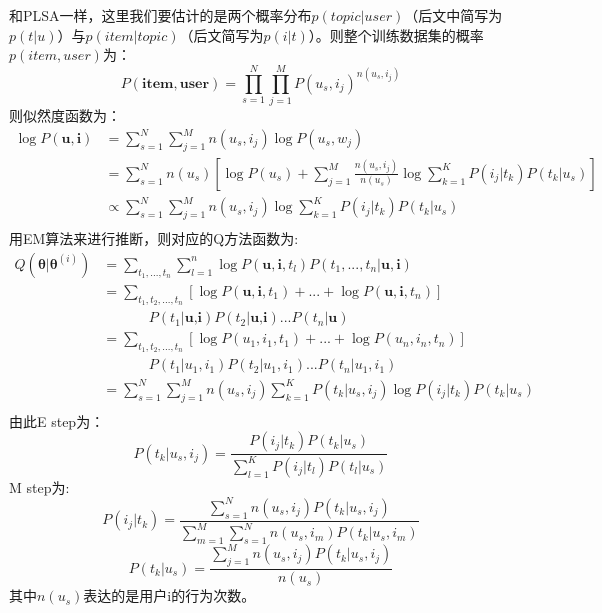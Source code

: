 和PLSA一样，这里我们要估计的是两个概率分布$p(topic|user)$（后文中简写为$p(t|u)$）与$p(item|topic)$（后文简写为$p(i|t)$）。则整个训练数据集的概率$p(item, user)$为：
\begin{equation}
P(\mathbf{item, user}) = \prod_{s=1}^N \prod_{j=1}^M P(u_s, i_j)^{n(u_s, i_j)}
\end{equation}
则似然度函数为：
\begin{equation}
\begin{split} \log P(\mathbf{u,i}) &= \sum_{s=1}^N \sum_{j=1}^M n(u_s, i_j) \log P(u_s, w_j) \\ &= \sum_{s=1}^N n(u_s) [\log P(u_s) + \sum_{j=1}^M \frac{n(u_s, i_j)}{n(u_s)} \log \sum_{k=1}^K P(i_j|t_k) P(t_k|u_s)] \\ & \propto \sum_{s=1}^N \sum_{j=1}^M n(u_s, i_j) \log \sum_{k=1}^K P(i_j|t_k) P(t_k|u_s) \\ \end{split} 
\end{equation}
用EM算法来进行推断，则对应的Q方法函数为:
\begin{equation} \begin{split} Q(\bm\theta|\bm\theta^{(i)}) &= \sum_{t_1, ..., t_n} \sum_{l=1}^n \log P(\mathbf{u,i},t_l) P(t_1, ..., t_n|\mathbf{u,i}) \\ &= \sum_{t_1,t_2,...,t_n} [ \log P(\mathbf{u,i},t_1) + ... + \log P(\mathbf{u,i},t_n)] \\ & \ \ \ \ \ \ \ \ \ \ \ \ \ \ \ P(t_1|\textbf{u,i}) P(t_2|\textbf{u,i}) ... P(t_n|\textbf{u}) \\ &= \sum_{t_1,t_2,...,t_n} [\log P(u_1,i_1,t_1) + ... + \log P(u_n,i_n,t_n)] \\ & \ \ \ \ \ \ \ \ \ \ \ \ \ \ \ P(t_1|u_1,i_1) P(t_2|u_1,i_1) ... P(t_n|u_1,i_1) \\ &= \sum_{s=1}^N \sum_{j=1}^M n(u_s, i_j) \sum_{k=1}^K P (t_k|u_s, i_j)\log P(i_j|t_k) P(t_k|u_s) \\ \end{split} \end{equation}
由此E step为：
\begin{equation}
P (t_k|u_s, i_j) = \frac{P(i_j|t_k)P(t_k|u_s)}{\sum_{l=1}^K P(i_j|t_l) P(t_l|u_s)}
\end{equation}
M step为:
\begin{equation}
P(i_j|t_k) = \frac{\sum_{s=1}^N n(u_s,i_j) P(t_k|u_s,i_j)}{\sum_{m=1}^M\sum_{s=1}^N n(u_s,i_m) P(t_k|u_s,i_m)}
\end{equation}
\begin{equation}
P(t_k|u_s) = \frac{\sum_{j=1}^M n(u_s,i_j)P(t_k|u_s,i_j)}{n(u_s)}
\end{equation}
其中$n(u_s)$表达的是用户i的行为次数。

